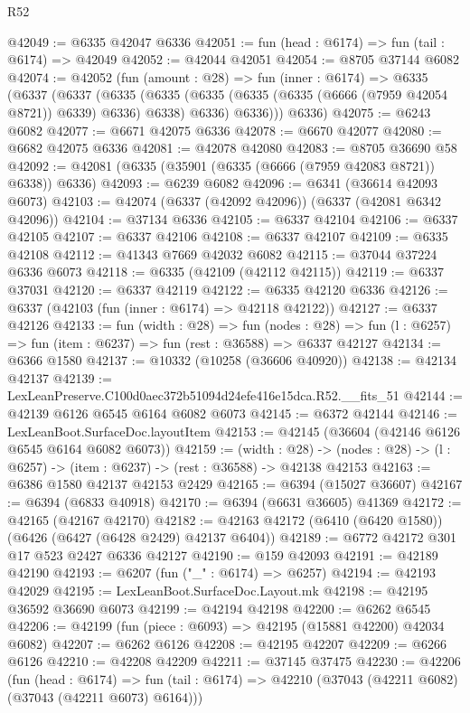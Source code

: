 \begin{lexlean}{R52}
\begin{coremodule}
@42049 := @6335 @42047 @6336
@42051 := fun (head : @6174) => fun (tail : @6174) => @42049
@42052 := @42044 @42051
@42054 := @8705 @37144 @6082
@42074 := @42052
    (fun (amount : @28) =>
    fun (inner : @6174) =>
    @6335
      (@6337
        (@6337
          (@6335
            (@6335 (@6335 (@6335 (@6335 (@6666 (@7959 @42054 @8721)) @6339) @6336) @6338) @6336)
            @6336)))
      @6336)
@42075 := @6243 @6082
@42077 := @6671 @42075 @6336
@42078 := @6670 @42077
@42080 := @6682 @42075 @6336
@42081 := @42078 @42080
@42083 := @8705 @36690 @58
@42092 := @42081 (@6335 (@35901 (@6335 (@6666 (@7959 @42083 @8721)) @6338)) @6336)
@42093 := @6239 @6082
@42096 := @6341 (@36614 @42093 @6073)
@42103 := @42074 (@6337 (@42092 @42096)) (@6337 (@42081 @6342 @42096))
@42104 := @37134 @6336
@42105 := @6337 @42104
@42106 := @6337 @42105
@42107 := @6337 @42106
@42108 := @6337 @42107
@42109 := @6335 @42108
@42112 := @41343 @7669 @42032 @6082
@42115 := @37044 @37224 @6336 @6073
@42118 := @6335 (@42109 (@42112 @42115))
@42119 := @6337 @37031
@42120 := @6337 @42119
@42122 := @6335 @42120 @6336
@42126 := @6337 (@42103 (fun (inner : @6174) => @42118 @42122))
@42127 := @6337 @42126
@42133 := fun (width : @28) =>
  fun (nodes : @28) => fun (l : @6257) => fun (item : @6237) => fun (rest : @36588) => @6337 @42127
@42134 := @6366 @1580
@42137 := @10332 (@10258 (@36606 @40920))
@42138 := @42134 @42137
@42139 := LexLeanPreserve.C100d0aec372b51094d24efe416e15dca.R52.__fits_51
@42144 := @42139 @6126 @6545 @6164 @6082 @6073
@42145 := @6372 @42144
@42146 := LexLeanBoot.SurfaceDoc.layoutItem
@42153 := @42145 (@36604 (@42146 @6126 @6545 @6164 @6082 @6073))
@42159 := (width : @28) ->
  (nodes : @28) -> (l : @6257) -> (item : @6237) -> (rest : @36588) -> @42138 @42153
@42163 := @6386 @1580 @42137 @42153 @2429
@42165 := @6394 (@15027 @36607)
@42167 := @6394 (@6833 @40918)
@42170 := @6394 (@6631 @36605) @41369
@42172 := @42165 (@42167 @42170)
@42182 := @42163 @42172 (@6410 (@6420 @1580)) (@6426 (@6427 (@6428 @2429) @42137 @6404))
@42189 := @6772 @42172 @301 @17 @523 @2427 @6336 @42127
@42190 := @159 @42093
@42191 := @42189 @42190
@42193 := @6207 (fun ("_" : @6174) => @6257)
@42194 := @42193 @42029
@42195 := LexLeanBoot.SurfaceDoc.Layout.mk
@42198 := @42195 @36592 @36690 @6073
@42199 := @42194 @42198
@42200 := @6262 @6545
@42206 := @42199 (fun (piece : @6093) => @42195 (@15881 @42200) @42034 @6082)
@42207 := @6262 @6126
@42208 := @42195 @42207
@42209 := @6266 @6126
@42210 := @42208 @42209
@42211 := @37145 @37475
@42230 := @42206
    (fun (head : @6174) =>
    fun (tail : @6174) => @42210 (@37043 (@42211 @6082) (@37043 (@42211 @6073) @6164)))

\end{coremodule}
\end{lexlean}
